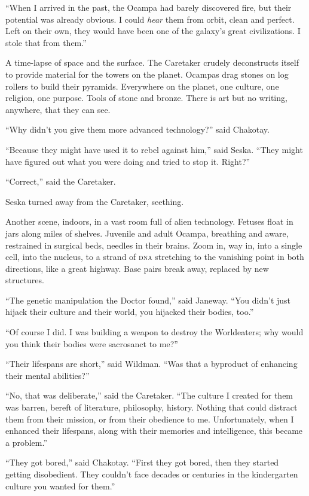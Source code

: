 \documentclass[twoside,letterpaper,12pt]{memoir}
\begin{document}
``When I arrived in the past, the Ocampa had barely discovered fire, but their potential was already obvious. I could \textit{hear} them from orbit, clean and perfect. Left on their own, they would have been one of the galaxy’s great civilizations. I stole that from them.” 

A time-lapse of space and the surface. The Caretaker crudely deconstructs itself to provide material for the towers on the planet. Ocampas drag stones on log rollers to build their pyramids. Everywhere on the planet, one culture, one religion, one purpose. Tools of stone and bronze. There is art but no writing, anywhere, that they can see. 

``Why didn’t you give them more advanced technology?” said Chakotay. 

``Because they might have used it to rebel against him,” said Seska. ``They might have figured out what you were doing and tried to stop it. Right?” 

``Correct,” said the Caretaker. 

Seska turned away from the Caretaker, seething. 

Another scene, indoors, in a vast room full of alien technology. Fetuses float in jars along miles of shelves. Juvenile and adult Ocampa, breathing and aware, restrained in surgical beds, needles in their brains. Zoom in, way in, into a single cell, into the nucleus, to a strand of \textsc{dna} stretching to the vanishing point in both directions, like a great highway. Base pairs break away, replaced by new structures. 

``The genetic manipulation the Doctor found,” said Janeway. ``You didn’t just hijack their culture and their world, you hijacked their bodies, too.” 

``Of course I did. I was building a weapon to destroy the Worldeaters; why would you think their bodies were sacrosanct to me?” 

``Their lifespans are short,” said Wildman. ``Was that a byproduct of enhancing their mental abilities?” 

``No, that was deliberate,” said the Caretaker. ``The culture I created for them was barren, bereft of literature, philosophy, history. Nothing that could distract them from their mission, or from their obedience to me. Unfortunately, when I enhanced their lifespans, along with their memories and intelligence, this became a problem.” 

``They got bored,” said Chakotay. ``First they got bored, then they started getting disobedient. They couldn’t face decades or centuries in the kindergarten culture you wanted for them.” 
\end{document}

